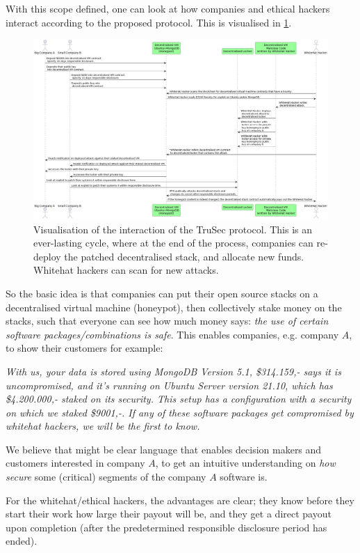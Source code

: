 \noindent With this scope defined, one can look at how companies and ethical hackers interact according to the proposed protocol. This is visualised in \cref{fig:interaction}.

\begin{figure}[H]
    \centering
    \includegraphics[width=1.0\textwidth]{images/plantuml/interaction.png}
    \caption{Visualisation of the interaction of the TruSec protocol. This is an ever-lasting cycle, where at the end of the process, companies can re-deploy the patched decentralised stack, and allocate new funds. Whitehat hackers can scan for new attacks.}
    \label{fig:interaction}
\end{figure}
\noindent So the basic idea is that companies can put their open source stacks on a decentralised virtual machine (honeypot), then collectively stake money on the stacks, such that everyone can see how much money says: \textit{the use of certain software packages/combinations is safe}. This enables companies, e.g. company $A$, to show their customers for example:

\textit{With us, your data is stored using MongoDB Version 5.1, \$314.159,- says it is uncompromised, and it's running on Ubuntu Server version 21.10, which has \$4.200.000,- staked on its security. This setup has a configuration with a security on which we staked \$9001,-. If any of these software packages get compromised by whitehat hackers, we will be the first to know.}

We believe that might be clear language that enables decision makers and customers interested in company $A$, to get an intuitive understanding on \textit{how secure} some (critical) segments of the company $A$ software is.

For the whitehat/ethical hackers, the advantages are clear; they know before they start their work how large their payout will be, and they get a direct payout upon completion (after the predetermined responsible disclosure period has ended).

